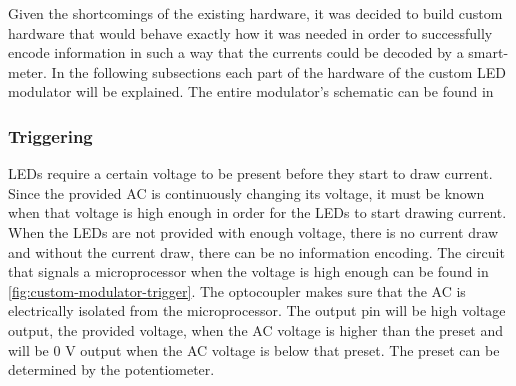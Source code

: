 Given the shortcomings of the existing hardware, it was decided to build custom hardware that would behave exactly how it was needed in order to successfully encode information in such a way that the currents could be decoded by a smart-meter.
In the following subsections each part of the hardware of the custom LED modulator will be explained.
The entire modulator's schematic can be found in 



	\subsubsection{Triggering}

	LEDs require a certain voltage to be present before they start to draw current.
	Since the provided AC is continuously changing its voltage, it must be known when that voltage is high enough in order for the LEDs to start drawing current.
	When the LEDs are not provided with enough voltage, there is no current draw and without the current draw, there can be no information encoding.
	The circuit that signals a microprocessor when the voltage is high enough can be found in \autoref{fig:custom-modulator-trigger}.
	The optocoupler makes sure that the AC is electrically isolated from the microprocessor.
	The output pin will be high voltage output, the provided voltage, when the AC voltage is higher than the preset and will be 0 V output when the AC voltage is below that preset.
	The preset can be determined by the potentiometer.

	


